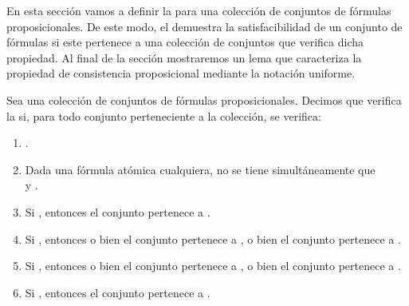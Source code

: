 %
\begin{isabellebody}%
%
%
\isadelimtheory
%
\endisadelimtheory
%
\isatagtheory
%
\endisatagtheory
{\isafoldtheory}%
%
\isadelimtheory
%
\endisadelimtheory
%
\begin{isamarkuptext}%
En esta sección vamos a definir la  para una 
  colección de conjuntos de fórmulas proposicionales. De este modo, el  demuestra la satisfacibilidad de un conjunto de fórmulas si este pertenece a una 
  colección de conjuntos que verifica dicha propiedad. Al final de la sección mostraremos un 
  lema que caracteriza la propiedad de consistencia proposicional mediante la notación uniforme.

  \begin{definicion}
    Sea  una colección de conjuntos de fórmulas proposicionales. Decimos que
     verifica la  si, para todo
    conjunto  perteneciente a la colección, se verifica:
    \begin{enumerate}
      \item {}.
      \item Dada  una fórmula atómica cualquiera, no se tiene 
        simultáneamente que\\  y .
      \item Si , entonces el conjunto  pertenece a .
      \item Si , entonces o bien el conjunto  pertenece a , o bien el 
        conjunto  pertenece a .
      \item Si , entonces o bien el conjunto  pertenece a , o bien el 
        conjunto  pertenece a .
      \item Si , entonces el conjunto  pertenece a .

\end{enumerate}
\end{definicion}
\end{isamarkuptext}
\end{isabellebody}
